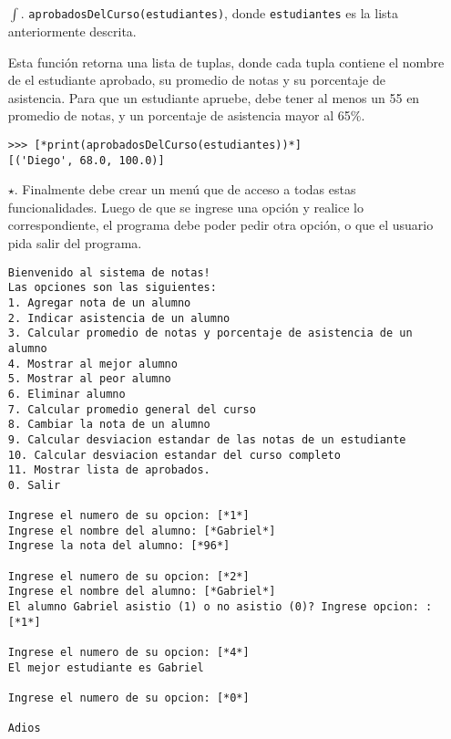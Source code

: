 \begin{enumerate}
    \item [$\int$. ] \texttt{aprobadosDelCurso(estudiantes)}, donde \texttt{estudiantes} es la lista anteriormente descrita.
    
    Esta función retorna una lista de tuplas, donde cada tupla contiene el nombre de el estudiante aprobado, su promedio de notas y su porcentaje de asistencia. Para que un estudiante apruebe, debe tener al menos un 55 en promedio de notas, y un porcentaje de asistencia mayor al 65\%.

\begin{lstlisting}[style=consola]
>>> [*print(aprobadosDelCurso(estudiantes))*]
[('Diego', 68.0, 100.0)]
\end{lstlisting}
\newpage
    \item[$\star$. ] Finalmente debe crear un menú que de acceso a todas estas funcionalidades. Luego de que se ingrese una opción y realice lo correspondiente, el programa debe poder pedir otra opción, o que el usuario pida salir del programa.

\begin{lstlisting}[style=consola]
Bienvenido al sistema de notas!
Las opciones son las siguientes:
1. Agregar nota de un alumno
2. Indicar asistencia de un alumno
3. Calcular promedio de notas y porcentaje de asistencia de un alumno
4. Mostrar al mejor alumno
5. Mostrar al peor alumno
6. Eliminar alumno
7. Calcular promedio general del curso
8. Cambiar la nota de un alumno
9. Calcular desviacion estandar de las notas de un estudiante
10. Calcular desviacion estandar del curso completo
11. Mostrar lista de aprobados.
0. Salir

Ingrese el numero de su opcion: [*1*]
Ingrese el nombre del alumno: [*Gabriel*]
Ingrese la nota del alumno: [*96*]

Ingrese el numero de su opcion: [*2*]
Ingrese el nombre del alumno: [*Gabriel*]
El alumno Gabriel asistio (1) o no asistio (0)? Ingrese opcion: : [*1*]

Ingrese el numero de su opcion: [*4*]
El mejor estudiante es Gabriel

Ingrese el numero de su opcion: [*0*]

Adios
\end{lstlisting}

\end{enumerate}
